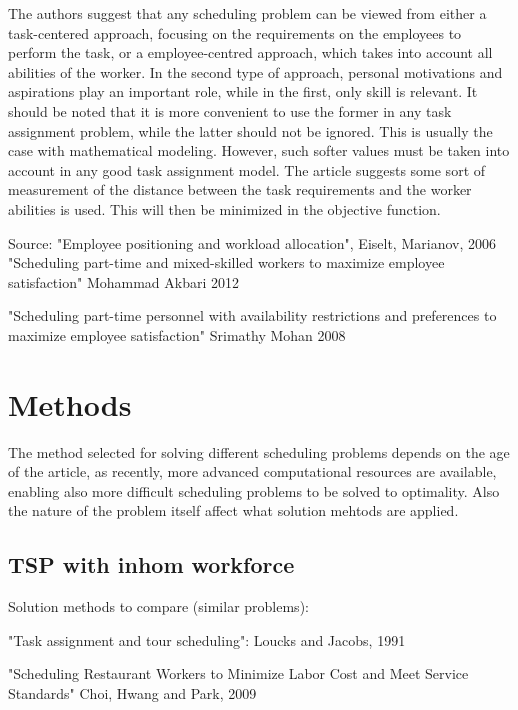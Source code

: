 The authors suggest that any scheduling problem can be viewed from either a task-centered approach, focusing on the requirements on the employees to perform the task, or a employee-centred approach, which takes into account all abilities of the worker. In the second type of approach, personal motivations and aspirations play an important role, while in the first, only skill is relevant. It should be noted that it is more convenient to use the former in any task assignment problem, while the latter should not be ignored. This is usually the case with mathematical modeling. However, such softer values must be taken into account in any good task assignment model. The article suggests some sort of measurement of the distance between the task requirements and the worker abilities is used. This will then be minimized in the objective function.

Source: "Employee positioning and workload allocation", Eiselt, Marianov, 2006
"Scheduling part-time and mixed-skilled workers to maximize employee satisfaction" Mohammad Akbari 2012

"Scheduling part-time personnel with availability restrictions and preferences to maximize employee satisfaction" Srimathy Mohan 2008


\section{Methods}
The method selected for solving different scheduling problems depends on the age of the article, as recently, more advanced computational resources are available, enabling also more difficult scheduling problems to be solved to optimality. Also the nature of the problem itself affect what solution mehtods are applied. 


\subsection{TSP with inhom workforce}

Solution methods to compare (similar problems):

"Task assignment and tour scheduling": Loucks and Jacobs, 1991


"Scheduling Restaurant Workers to Minimize Labor Cost and Meet Service Standards" Choi, Hwang and Park, 2009

"An integer linear programming-based heuristic for scheduling heterogeneous, part-time service employees" Heterogenous work force, tour scheduling. Using two objective functions Hojati and Patil, 2010

for another definition as PTSP[F;I;I;W], see "The Personnel Task Scheduling Problem" by Krishnamoorty and Ernst, 2001

\subsection{Integer Programming}

\subsection{Similated Anneahling}


\subsection{Heuristics}

